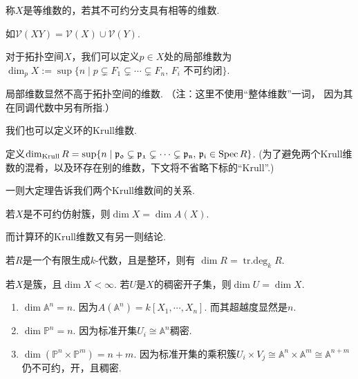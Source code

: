     \begin{definition}
        称$X$是等维数的，若其不可约分支具有相等的维数.
    \end{definition}

    \begin{example}
        如$\mathcal{V}(XY)=\mathcal{V}(X)\cup\mathcal{V}(Y)$.
    \end{example}

    \begin{definition}
        对于拓扑空间$X$，我们可以定义$p \in X$处的局部维数为
        $\dim_{p}X:=\sup\{n \mid {p} \subsetneq F_{1} \subsetneq \cdots \subsetneq F_{n}, \, F_{i}\text{ 不可约闭}\}$.
    \end{definition}

    \begin{remark}
        局部维数显然不高于拓扑空间的维数. （注：这里不使用“整体维数”一词，
        因为其在同调代数中另有所指.）
    \end{remark}

    我们也可以定义环的Krull维数.
    \begin{definition}[交换幺环的Krull维数]
        定义$\dim_{\rm Krull} R = \sup\{n \mid \mathfrak{p_{0}} \subsetneq \mathfrak{p_{1}} \subsetneq \cdots \subsetneq \mathfrak{p_{n}}, \, \mathfrak{p_{i}} \in \operatorname{Spec}R\}$.
        (为了避免两个Krull维数的混肴，以及环存在别的维数，下文将不省略下标的``Krull''.)
    \end{definition}

    一则大定理告诉我们两个Krull维数间的关系.
    \begin{theorem}
        若$X$是不可约仿射簇，则$\dim X = \dim A(X)$.
    \end{theorem}

    而计算环的Krull维数又有另一则结论.
    \begin{theorem}
        若$R$是一个有限生成$k$-代数，且是整环，则有
        $\dim R = \operatorname{tr.deg}_{k} R$.
    \end{theorem}

    \begin{proposition}
        若$X$是簇，且$\dim X < \infty$. 若$U$是$X$的稠密开子集，则$\dim U =\dim X$.
    \end{proposition}
    
    \begin{example}
        \begin{enumerate}
            \item[(1)] $\dim \mathbb{A}^{n} = n$. 
                       因为$A(\mathbb{A}^{n})=k[X_{1},\cdots,X_{n}]$. 而其超越度显然是$n$.
            \item[(2)] $\dim \mathbb{P}^{n} = n$.
                       因为标准开集$U_{i} \cong \mathbb{A}^{n}$稠密.
            \item[(3)] $\dim (\mathbb{P}^{n} \times \mathbb{P}^{m}) = n+m$.
                       因为标准开集的乘积簇$U_{i} \times V_{j} \cong \mathbb{A}^{n}\times\mathbb{A}^{m} \cong \mathbb{A}^{n+m}$仍不可约，开，且稠密.
        \end{enumerate}
    \end{example}

